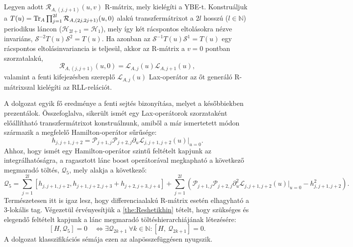 \documentclass[12pt,a4paper,oneside]{report}
\newcommand{\R}{\mathcal{R}}
\renewcommand{\L}{\mathcal{L}}
\renewcommand{\P}{\mathcal{P}}
\newcommand{\Q}{\mathcal{Q}}
\newcommand{\Shift}{\mathcal{S}}
\newcommand{\hjtri}{h_{j,j+1,j+2}}
\newcommand{\N}{\mathbb{N}}
\newcommand{\Hil}{\mathscr{H}}
\begin{document}
\begin{sejtes}\label{conj:R_mat_sep}
    Legyen adott $\R_{A,(j,j+1)}(u,v)$ R-mátrix, mely kielégíti a YBE-t. Konstruáljuk a $T(u)=\Tr_A\prod_{j=1}^{2l}\R_{A,(2j,2j+1)}(u,0)$ alakú transzfermátrixot a $2l$ hosszú ($l\in\N$) periodikus láncon ($\Hil_{2l+1}=\Hil_1$), mely így két rácspontos eltolásokra nézve invariáns, $\Shift^{-2}T(u)\Shift^{2}=T(u)$. Ha azonban az $\Shift^{-1}T(u)\Shift^{1}=T(u)$ egy rácspontos eltolásinvariancia is teljesül, akkor az R-mátrix a $v=0$ pontban szorzatalakú,
    \begin{equation}
        \R_{A,(j,j+1)}(u,0)=\L_{A,j}(u)\L_{A,j+1}(u),
    \end{equation}
    valamint a fenti kifejezésben szereplő $\L_{A,j}(u)$ Lax-operátor az őt generáló R-mátrixszal kielégíti az RLL-relációt.
\end{sejtes}
A dolgozat egyik fő eredménye a fenti sejtés bizonyítása, melyet a későbbiekben prezentálok. Összefoglalva, sikerült ismét egy Lax-operátorok szorzataként előállítható transzfermátrixot konstruálnunk, amiből a már ismertetett módon származik a megfelelő Hamilton-operátor sűrűsége:
\begin{equation}
    h_{j,j+1,j+2}=\P_{j+1,j}\P_{j+2,j}\partial_u\L_{j,j+1,j+2}(u)\big|_{u=0}.
\end{equation}
Ahhoz, hogy ismét egy Hamilton-operátor szintű feltételt kapjunk az integrálhatóságra, a ragasztott lánc boost operátorával megkapható a következő megmaradó töltés, $\Q_5$, mely alakja a következő:
\begin{equation}\label{eq:q5_dens}
    \Q_5=\sum_{j=1}^{2l}[\hjtri, h_{j+1,j+2,j+3}+h_{j+2,j+3,j+4}]+\sum_{j=1}^{2l}\left(\P_{j+1,j}\P_{j+2,j}\partial_u^2\L_{j,j+1,j+2}(u)\big|_{u=0}-\hjtri^2\right).
\end{equation}
Természetesen itt is igaz lesz, hogy differenciaalakú R-mátrix esetén elhagyható a 3-lokális tag. Végezetül érvényesítjük a \ref{the:Reshetikhin} tételt, hogy szükséges és elegendő feltételt kapjunk a lánc megmaradó töltéshierarchiájának létezésére:
\begin{equation}\label{eq:HQ5_comm}
    [H,\Q_5]=0 \quad \Leftrightarrow \exists\Q_{2k+1}\ \forall k\in\N: [H,\ \Q_{2k+1}]=0.
\end{equation}
A dolgozat klasszifikációs sémája ezen az alapösszefüggésen nyugszik.
\end{document}
